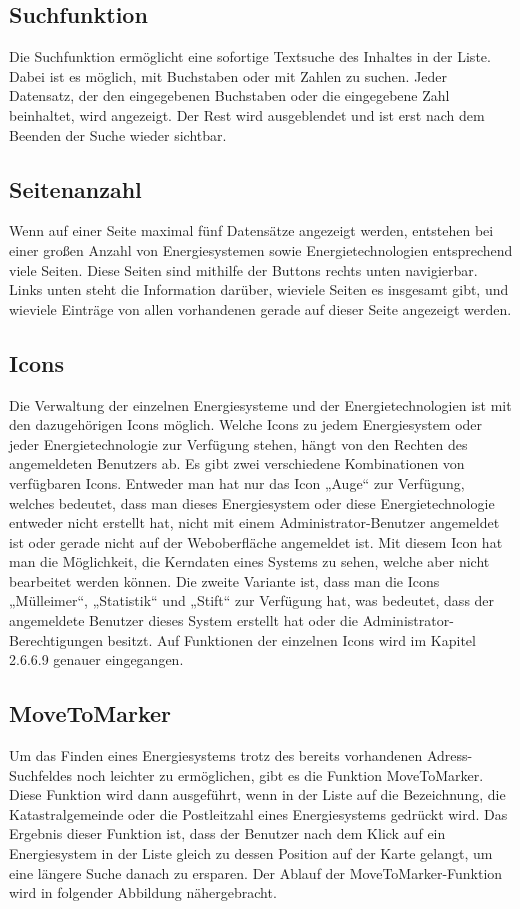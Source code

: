 \subsection{Suchfunktion}
Die Suchfunktion ermöglicht eine sofortige Textsuche des Inhaltes in der Liste. Dabei ist es möglich, mit Buchstaben oder mit Zahlen zu suchen. Jeder Datensatz, der den eingegebenen Buchstaben oder die eingegebene Zahl beinhaltet, wird angezeigt. Der Rest wird ausgeblendet und ist erst nach dem Beenden der Suche wieder sichtbar.


\subsection{Seitenanzahl}
Wenn auf einer Seite maximal fünf Datensätze angezeigt werden, entstehen bei einer großen Anzahl von Energiesystemen sowie Energietechnologien entsprechend viele Seiten. Diese Seiten sind mithilfe der Buttons rechts unten navigierbar. Links unten steht die Information darüber, wieviele Seiten es insgesamt gibt, und wieviele Einträge von allen vorhandenen gerade auf dieser Seite angezeigt werden.


\subsection{Icons}
Die Verwaltung der einzelnen Energiesysteme und der Energietechnologien ist mit den dazugehörigen Icons möglich. Welche Icons zu jedem Energiesystem oder jeder Energietechnologie zur Verfügung stehen, hängt von den Rechten des angemeldeten Benutzers ab.
Es gibt zwei verschiedene Kombinationen von verfügbaren Icons.
Entweder man hat nur das Icon „Auge“ zur Verfügung, welches bedeutet, dass man dieses Energiesystem oder diese Energietechnologie entweder nicht erstellt hat, nicht mit einem Administrator-Benutzer angemeldet ist oder gerade nicht auf der Weboberfläche angemeldet ist. Mit diesem Icon hat man die Möglichkeit, die Kerndaten eines Systems zu sehen, welche aber nicht bearbeitet werden können.
Die zweite Variante ist, dass man die Icons „Mülleimer“, „Statistik“ und „Stift“ zur Verfügung hat, was bedeutet, dass der angemeldete Benutzer dieses System erstellt hat oder die Administrator-Berechtigungen besitzt. 
Auf Funktionen der einzelnen Icons wird im Kapitel 2.6.6.9 genauer eingegangen.



\subsection{MoveToMarker}
Um das Finden eines Energiesystems trotz des bereits vorhandenen Adress-Suchfeldes noch leichter zu ermöglichen, gibt es die Funktion MoveToMarker. Diese Funktion wird dann ausgeführt, wenn in der Liste auf die Bezeichnung, die Katastralgemeinde oder die Postleitzahl eines Energiesystems gedrückt wird. Das Ergebnis dieser Funktion ist, dass der Benutzer nach dem Klick auf ein Energiesystem in der Liste gleich zu dessen Position auf der Karte gelangt, um eine längere Suche danach zu ersparen. Der Ablauf der MoveToMarker-Funktion wird in folgender Abbildung nähergebracht.

